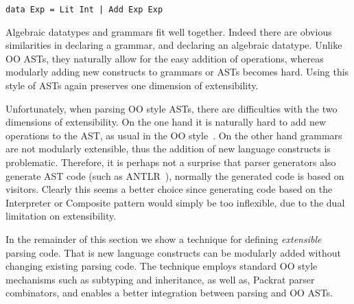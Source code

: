 \begin{lstlisting}
data Exp = Lit Int | Add Exp Exp
\end{lstlisting}

Algebraic datatypes and grammars fit well together. Indeed there are
obvious similarities in declaring a grammar, and declaring an
algebraic datatype. Unlike OO ASTs, they naturally allow for the easy
addition of operations, whereas modularly adding new constructs to grammars
or ASTs becomes hard. Using this style of ASTs again preserves one dimension of extensibility.

Unfortunately, when parsing OO style ASTs, there are difficulties with
the two dimensions of extensibility. On the one hand it is naturally hard to
add new operations to the AST, as usual in the OO
style~\cite{wadler1998expression}. On the other hand
grammars are not modularly extensible, thus the addition of new
language constructs is problematic. Therefore,
it is perhaps not a surprise that parser generators also generate
AST code (such as ANTLR~\cite{antlr1995}), normally the generated code is based on
visitors. Clearly this seems a better choice since generating code
based on the {\sc Interpreter} or {\sc Composite} pattern would
simply be too inflexible, due to the dual limitation on extensibility.

In the remainder of this section we show a technique for
defining \emph{extensible} parsing code. That is new
language constructs can be modularly added without changing
existing parsing code. The technique employs standard OO
style mechanisms such as subtyping and inheritance, as well as,
Packrat parser combinators, and enables a better integration between
parsing and OO ASTs.


